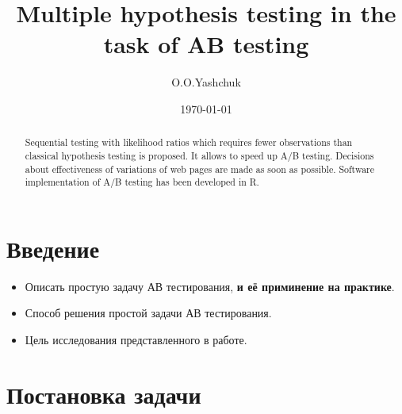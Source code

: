 \documentclass[a4paper,12pt]{article}
\author{O.O.Yashchuk} %
\title{Multiple hypothesis testing in the task of AB testing}
\date{\today}
\begin{document}

\maketitle

\begin{abstract}
Sequential testing with likelihood ratios which requires fewer observations than classical hypothesis testing is proposed. It allows to speed up A/B testing. Decisions about effectiveness of variations of web pages are made as soon as possible. Software implementation of A/B testing has been developed in R.
\end{abstract}

\tableofcontents


\section{Введение}
\begin{itemize}
	\item Описать простую задачу АВ тестирования, \textbf{и её приминение на практике}.
	\item Способ решения простой задачи АВ тестирования.
	\item Цель исследования представленного в работе.
\end{itemize}

\section{Постановка задачи}
\end{document}

